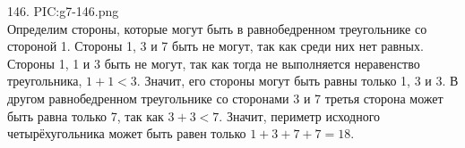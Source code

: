 146. {{PIC:g7-146.png}}\\
Определим стороны, которые могут быть в равнобедренном треугольнике со стороной 1. Стороны 1, 3 и 7 быть не могут, так как среди них нет равных. Стороны 1, 1 и 3 быть не могут, так как тогда не выполняется неравенство треугольника,  $1+1<3.$ Значит, его стороны могут быть равны только 1, 3 и 3. В другом равнобедренном треугольнике со сторонами 3 и 7 третья сторона может быть равна только 7, так как $3+3<7.$ Значит, периметр исходного четырёхугольника может быть равен только $1+3+7+7=18.$\\
